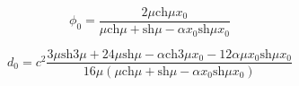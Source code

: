\documentclass[12pt]{extarticle}
\begin{document}
$$ \phi_0 = \frac{2\mu\mbox{ch}\mu x_0}{\mu\mbox{ch}\mu + \mbox{sh}\mu - \alpha x_0\mbox{sh}\mu x_0} $$

$$ d_0 = c^2\frac{3\mu\mbox{sh}3\mu + 24\mu\mbox{sh}\mu - \alpha\mbox{ch}3\mu x_0 - 12\alpha\mu x_0 \mbox{sh}\mu x_0}{16\mu(\mu\mbox{ch}\mu + \mbox{sh}\mu - \alpha x_0\mbox{sh}\mu x_0)} $$
\end{document}

